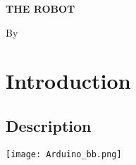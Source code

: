 \documentclass[a4paper,10pt,toc=graduated]{article}
\author{\docauthor}
\title{\doctitle}
\newcommand*\docauthor{
Josh Gillham
\\
Matt Wicke
\\
}
\newcommand*\doctitle{The Robot}
\begin{document}
\vspace*{\fill}

\begin{center}
\begin{em}
\bf
\huge
\noindent
\uppercase{
\doctitle
}
\end{em}
\end{center}
\vspace{\fill}

\begin{center}
\tiny
By

\begin{em}
\small
\noindent
\uppercase{
\docauthor
}
\end{em}
\end{center}
\vspace{\fill}
\newpage
\setcounter{tocdepth}{2}
\tableofcontents
\newpage
\section{Introduction}
\subsection{Description}

\texttt{[image: Arduino\_bb.png]}
  
\end{document}
